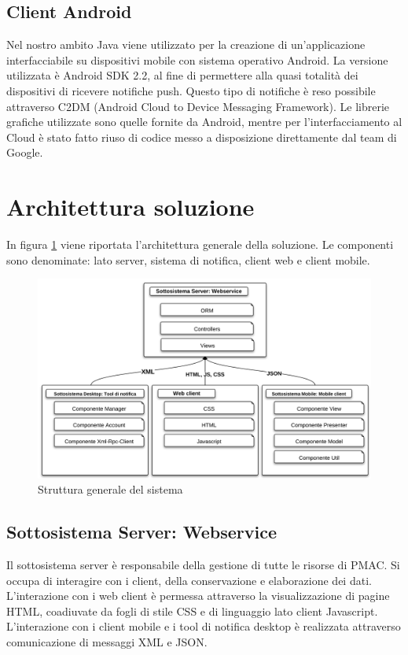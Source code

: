 {{\subsection{Client Android}
Nel nostro ambito Java viene utilizzato per la creazione di un'applicazione interfacciabile su dispositivi mobile con sistema operativo Android. La versione utilizzata è Android SDK 2.2, al fine di permettere alla quasi totalità dei dispositivi di ricevere notifiche push. Questo tipo di notifiche è reso possibile attraverso C2DM (Android Cloud to Device Messaging Framework). Le librerie grafiche utilizzate sono quelle fornite da Android, mentre per l'interfacciamento al Cloud è stato fatto riuso di codice messo a disposizione direttamente dal team di Google. 


\section{Architettura soluzione}

In figura \ref{StrutturaGeneraleSistema} viene riportata l'architettura generale della soluzione. Le componenti sono denominate: lato server, sistema di notifica, client web e client mobile. 

\begin{figure}[H]
\centering
\includegraphics[scale=0.6]{images/cap2/sistema.png} %
\caption{Struttura generale del sistema}
\label{StrutturaGeneraleSistema}
\end{figure}



\subsection{Sottosistema Server: Webservice}
Il sottosistema server è responsabile della gestione di tutte le risorse di PMAC. Si occupa di interagire con i client, della conservazione e elaborazione dei dati. L'interazione con i web client è permessa attraverso la visualizzazione di pagine HTML, coadiuvate da fogli di stile CSS e di linguaggio lato client Javascript. L'interazione con i client mobile e i tool di notifica desktop è realizzata attraverso comunicazione di messaggi XML e JSON.

}}
